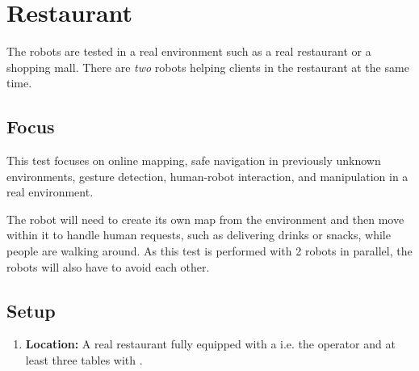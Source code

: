 \section{Restaurant}
The robots are tested in a real environment such as a real restaurant or a shopping mall.
There are \emph{two} robots helping clients in the restaurant at the same time.

\subsection{Focus}
This test focuses on online mapping, safe navigation in previously unknown environments, gesture detection, human-robot interaction, and manipulation in a real environment.

The robot will need to create its own map from the environment and then move within it to handle human requests, such as delivering drinks or snacks, while people are walking around.
As this test is performed with 2 robots in parallel, the robots will also have to avoid each other. 

\subsection{Setup}
\begin{enumerate}
	\item \textbf{Location:} A real restaurant fully equipped with a  i.e. the operator and at least three tables with . 
\end{enumerate}

